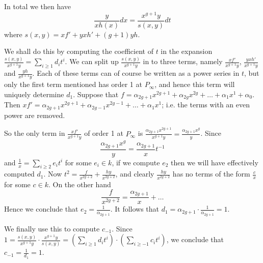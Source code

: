 \documentclass[draft, 11pt]{article} %
\theoremstyle{plain}
\theoremstyle{remark}
\begin{document}
In total we then have
\[
\frac{y}{xh(x)}dx = \frac{x^{g+1}y}{s(x,y)}dt
\]
where $s(x,y) = xf' + yxh' + (g+1)yh$.



We shall do this by computing the coefficient of $t$ in the expansion $\frac{s(x,y)}{x^{g+1}y} = \sum_{i\geq 1}d_it^i$.
We can split up $\frac{s(x,y)}{x^{g+1}y}$ in to three terms, namely $\frac{xf'}{x^{g+1}y}$, $\frac{yxh'}{x^{g+1}y}$ and $\frac{yh}{x^{g+1}y}$.
Each of these terms can of course be written as a power series in $t$, but only the first term mentioned has order 1 at $P_\infty$, and hence this term will uniquely determine $d_1$.
Suppose that $f = \alpha_{2g+1}x^{2g+1} + \alpha_{2g}x^{2g} + \ldots + \alpha_1x^1 + \alpha_0$.
Then $xf'= \alpha_{2g+1}x^{2g+1} + \alpha_{2g-1}x^{2g-1} + \ldots + \alpha_1x^1$; i.e. the terms with an even power are removed.

So the only term in $\frac{xf'}{x^{g+1}y}$ of order 1 at $P_\infty$ is $\frac{\alpha_{2g+1}x^{2g+1}}{x^{g+1}y} = \frac{\alpha_{2g+1}x^{g}}{y}$.
Since
\[
\frac{\alpha_{2g+1}x^g}{y} = \frac{\alpha_{2g+1}}{x}t^{-1}
\]
and $\frac{1}{x} = \sum_{i\geq 2}e_it^i$ for some $e_i \in k$, if we compute $e_2$ then we will have effectively computed $d_1$.
Now $t^2 = \frac{f }{x^{2g+2}}+ \frac{hy}{x^{2g+2}}$, and clearly $\frac{hy}{x^{2g+2}}$ has no terms of the form $\frac{c}{x}$ for some $c \in k$. 
On the other hand
\[
\frac{f}{x^{2g+2}} = \frac{\alpha_{2g+1}}{x} + \ldots
\]
Hence we conclude that $e_2 = \frac{1}{\alpha_{2g+1}}$.
It follows that $d_1 = \alpha_{2g+1} \cdot \frac{1}{\alpha_{2g+1}} = 1$.


We finally use this to compute $c_{-1}$.
Since $1 = \frac{s(x,y)}{x^{g+1}y}\cdot \frac{x^{g+1}y}{s(x,y)} = \left( \sum_{i\geq 1}d_it^i \right) \cdot \left( \sum_{i\geq -1}c_it^i\right)$, we conclude that $c_{-1} = \frac{1}{d_{1}} = 1$.
\end{document}
